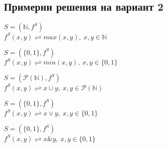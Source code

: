 \documentclass{article}
\begin{document}
\subsection{Примерни решения на вариант 2}
\begin{addmargin}[1em]{2em}
    \begin{center}
        $ S = ( \mathbb{N}, f^S)$ \\
        $f^S(x, y)\rightleftharpoons max(x,y),\ x,y \in \mathbb{N}$
    \end{center}
\end{addmargin}
\vskip 0.2in
\begin{addmargin}[1em]{2em}
    \begin{center}
        $ S = ( \{0, 1\}, f^S)$ \\
        $f^S(x,y)\rightleftharpoons min(x,y) ,\ x,y \in \{0, 1\}$
    \end{center}
\end{addmargin}
\vskip 0.2in
\begin{addmargin}[1em]{2em}
    \begin{center}
        $ S = ( \mathcal{P}(\mathbb{N}), f^S)$ \\
        $f^S(x,y)\rightleftharpoons x \cup y ,\ x,y \in \mathcal{P}(\mathbb{N})$
    \end{center}
\end{addmargin}
\vskip 0.2in
\begin{addmargin}[1em]{2em}
    \begin{center}
        $ S = ( \{0, 1\}, f^S)$ \\
        $f^S(x,y)\rightleftharpoons x \lor y ,\ x,y \in \{0, 1\}$
    \end{center}
\end{addmargin}
\vskip 0.2in
\begin{addmargin}[1em]{2em}
    \begin{center}
        $ S = ( \{0, 1\}, f^S)$ \\
        $f^S(x,y)\rightleftharpoons x \& y ,\ x,y \in \{0, 1\}$
    \end{center}
\end{addmargin}
\end{document}

